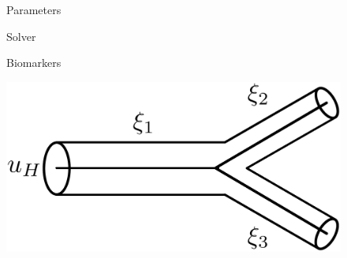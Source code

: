 \documentclass{beamer}
\begin{document}
\begin{frame}
\begin{figure}[htbp]
\begin{minipage}[c][0.35\paperheight][c]{\linewidth}
\begin{minipage}{0.1\linewidth}
			\end{minipage}
		\end{minipage}
		\begin{minipage}[t][0.06\paperheight][t]{\linewidth}
			\begin{minipage}{0.19\linewidth}
				\caption*{\tiny Parameters}
			\end{minipage}
			\begin{minipage}{0.1\linewidth}
				\caption*{\tiny}
			\end{minipage}
			\begin{minipage}{0.19\linewidth}
				\caption*{\tiny Solver}
			\end{minipage}
			\begin{minipage}{0.1\linewidth}
				\caption*{\tiny}
			\end{minipage}
			\begin{minipage}{0.19\linewidth}
				\caption*{\tiny Biomarkers}
			\end{minipage}
			\begin{minipage}{0.1\linewidth}
				\caption*{\tiny}
			\end{minipage}
		\end{minipage}
		\begin{minipage}[c][0.35\paperheight][c]{\linewidth}
			\begin{minipage}{0.19\linewidth}
				\includegraphics[width=\linewidth]{images/bifurcation.eps}
			\end{minipage}
			\begin{minipage}{0.1\linewidth}

\end{minipage}
\end{minipage}
\end{figure}
\end{frame}
\end{document}
